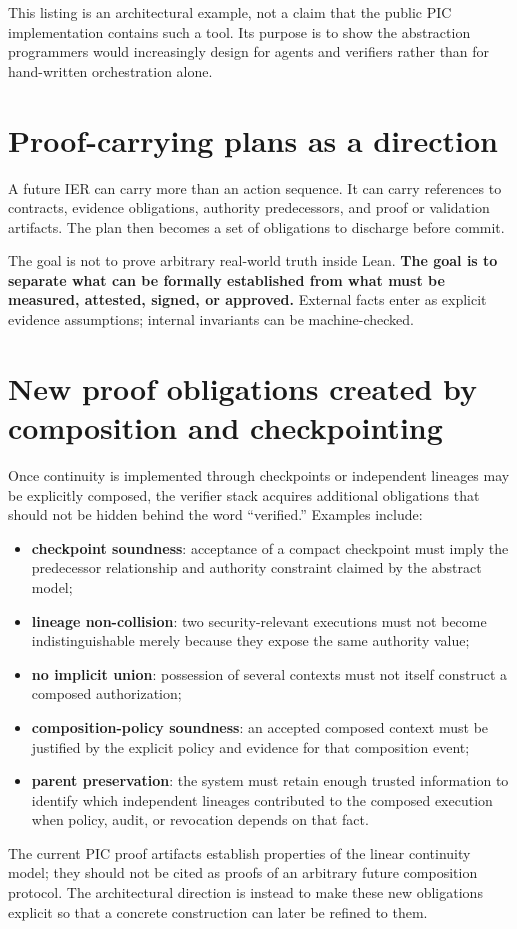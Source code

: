 \documentclass[10pt,oneside,openany]{book}
\begin{document}
This listing is an architectural example, not a claim that the public PIC implementation contains such a tool. Its purpose is to show the abstraction programmers would increasingly design for agents and verifiers rather than for hand-written orchestration alone.

\section{Proof-carrying plans as a direction}
A future IER can carry more than an action sequence. It can carry references to contracts, evidence obligations, authority predecessors, and proof or validation artifacts. The plan then becomes a set of obligations to discharge before commit.

The goal is not to prove arbitrary real-world truth inside Lean. \textbf{The goal is to separate what can be formally established from what must be measured, attested, signed, or approved.} External facts enter as explicit evidence assumptions; internal invariants can be machine-checked.

\section{New proof obligations created by composition and checkpointing}
Once continuity is implemented through checkpoints or independent lineages may be explicitly composed, the verifier stack acquires additional obligations that should not be hidden behind the word ``verified.'' Examples include:
\begin{itemize}
\item \textbf{checkpoint soundness}: acceptance of a compact checkpoint must imply the predecessor relationship and authority constraint claimed by the abstract model;
\item \textbf{lineage non-collision}: two security-relevant executions must not become indistinguishable merely because they expose the same authority value;
\item \textbf{no implicit union}: possession of several contexts must not itself construct a composed authorization;
\item \textbf{composition-policy soundness}: an accepted composed context must be justified by the explicit policy and evidence for that composition event;
\item \textbf{parent preservation}: the system must retain enough trusted information to identify which independent lineages contributed to the composed execution when policy, audit, or revocation depends on that fact.
\end{itemize}
The current PIC proof artifacts establish properties of the linear continuity model; they should not be cited as proofs of an arbitrary future composition protocol. The architectural direction is instead to make these new obligations explicit so that a concrete construction can later be refined to them.
\end{document}
